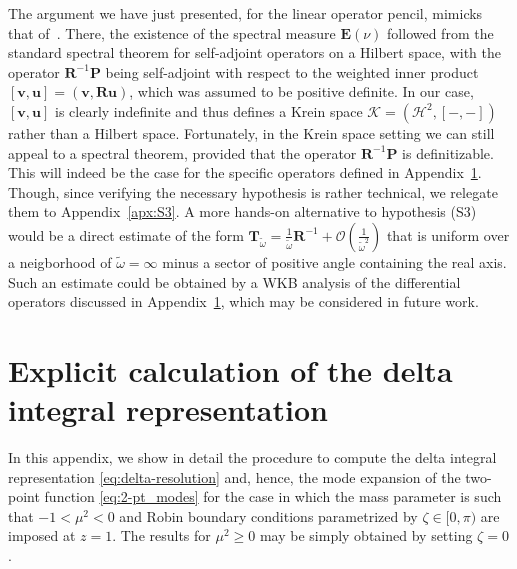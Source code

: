 \documentclass[aps, prd, amsmath, floats, floatfix, twocolumn, nofootinbib, superscriptaddress, showpacs]{revtex4-1}
\def\oo{\infty}
\def\H{\mathcal{H}}
\def\E{\mathbf{E}}
\def\P{\mathbf{P}}
\def\R{\mathbf{R}}
\def\T{\mathbf{T}}
\def\cK{\mathcal{K}}
\def\tomega{{\tilde{\omega}}}
\begin{document}
The argument we have just presented, for the linear operator pencil,
mimicks that of~\cite[Ch.9]{weidmann}. There, the existence of the
spectral measure $\E(\nu)$ followed from the standard spectral theorem
for self-adjoint operators on a Hilbert space, with the operator
$\R^{-1} \P$ being self-adjoint with respect to the weighted inner
product $[\mathbf{v},\mathbf{u}] = (\mathbf{v}, \R \mathbf{u})$, which
was assumed to be positive definite. In our case,
$[\mathbf{v},\mathbf{u}]$ is clearly indefinite and thus defines a Krein
space $\cK = (\H^2, [-,-])$ rather than a Hilbert space. Fortunately, in
the Krein space setting we can still appeal to a spectral theorem,
provided that the operator $\R^{-1} \P$ is definitizable. This will
indeed be the case for the specific operators defined in
Appendix~\ref{apx:calculation-delta-expansion}. Though, since verifying the necessary hypothesis
is rather technical, we relegate them to
Appendix~\ref{apx:S3}. A more hands-on alternative to
hypothesis (S3) would be a direct estimate of the form $\T_\tomega =
\frac{1}{\tomega} \R^{-1} + \mathcal{O}(\frac{1}{\tomega^2})$ that is uniform over
a neigborhood of $\tomega = \oo$ minus a sector of positive angle
containing the real axis. Such an estimate could be obtained by a WKB
analysis of the differential operators discussed in Appendix~\ref{apx:calculation-delta-expansion},
which may be considered in future work.


\vspace*{5ex}

\section{Explicit calculation of the delta integral representation}
\label{apx:calculation-delta-expansion}

In this appendix, we show in detail the procedure to compute the delta integral representation \eqref{eq:delta-resolution} and, hence, the mode expansion of the two-point function \eqref{eq:2-pt_modes} for the case in which the mass parameter is such that $-1 < \mu^2 < 0$ and Robin boundary conditions parametrized by $\zeta \in [0,\pi)$ are imposed at $z=1$. The results for $\mu^2 \geqslant 0$ may be simply obtained by setting $\zeta = 0$.
\end{document}
